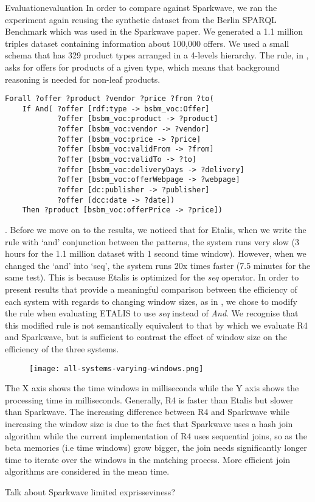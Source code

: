\begin{nestedsection}{Evaluation}{evaluation}
	In order to compare against Sparkwave, we ran the experiment again reusing the synthetic dataset from the Berlin SPARQL Benchmark \citep{BSBMresults} which was used in the Sparkwave paper.
	We generated a 1.1 million triples dataset containing information about 100,000 offers.
	We used a small schema that has 329 product types arranged in a 4-levels hierarchy.
	The rule, in , asks for offers for products of a given type, which means that background reasoning is needed for non-leaf products.
	\begin{figure*}[t]
		\centering
		\begin{verbatim}
Forall ?offer ?product ?vendor ?price ?from ?to(
    If And( ?offer [rdf:type -> bsbm_voc:Offer]
            ?offer [bsbm_voc:product -> ?product]
            ?offer [bsbm_voc:vendor -> ?vendor]
            ?offer [bsbm_voc:price -> ?price]
            ?offer [bsbm_voc:validFrom -> ?from]
            ?offer [bsbm_voc:validTo -> ?to]
            ?offer [bsbm_voc:deliveryDays -> ?delivery]
            ?offer [bsbm_voc:offerWebpage -> ?webpage]
            ?offer [dc:publisher -> ?publisher]
            ?offer [dcc:date -> ?date])
    Then ?product [bsbm_voc:offerPrice -> ?price])
		\end{verbatim}
		\caption{}
	\end{figure*}.
	Before we move on to the results, we noticed that for Etalis, when we write the rule with ‘and’ conjunction between the patterns, the system runs very slow (3 hours for the 1.1 million dataset with 1 second time window).
	However, when we changed the `and' into `seq', the system runs 20x times faster (7.5 minutes for the same test).
	This is because Etalis is optimized for the \emph{seq} operator.
	In order to present results that provide a meaningful comparison between the efficiency of each system with regards to changing window sizes, as in , we chose to modify the rule when evaluating ETALIS to use \emph{seq} instead of \emph{And}.
	We recognise that this modified rule is not semantically equivalent to that by which we evaluate R4 and Sparkwave, but is sufficient to contrast the effect of window size on the efficiency of the three systems.
	\begin{figure}
		\centering
		\texttt{[image: all-systems-varying-windows.png]}
		\caption{}
	\end{figure}
	The X axis shows the time windows in milliseconds while the Y axis shows the processing time in milliseconds.
	Generally, R4 is faster than Etalis but slower than Sparkwave.
	The increasing difference between R4 and Sparkwave while increasing the window size is due to the fact that Sparkwave uses a hash join algorithm while the current implementation of R4 uses sequential joins, so as the beta memories (i.e time windows) grow bigger, the join needs significantly longer time to iterate over the windows in the matching process.
	More efficient join algorithms are considered in the mean time.

	Talk about Sparkwave limited exprisseviness?

\end{nestedsection}
